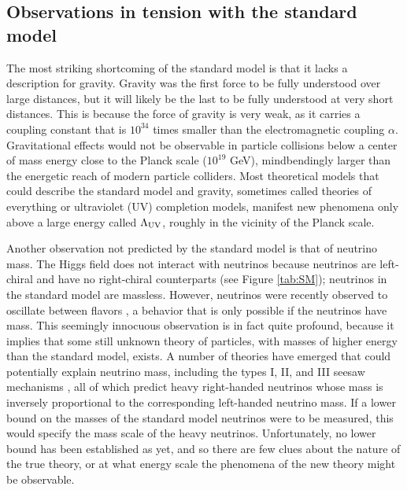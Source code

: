 \subsection{Observations in tension with the standard model}
The most striking shortcoming of the standard model is that it lacks a description for gravity.  Gravity was the first force to be fully understood over large distances, but it will likely be the last to be fully understood at very short distances. This is because the force of gravity is very weak, as it carries a coupling constant that is $10^{34}$ times smaller than the electromagnetic coupling $\alpha$. Gravitational effects would not be observable in particle collisions below a center of mass energy close to the Planck scale ($10^{19}$ GeV), mindbendingly larger than the energetic reach of modern particle colliders. Most theoretical models that could describe the standard model and gravity, sometimes called theories of everything or ultraviolet (UV) completion models, manifest new phenomena only above a large energy called $\Lambda_{\rm UV}$, roughly in the vicinity of the Planck scale. 

Another observation not predicted by the standard model is that of neutrino mass.  The Higgs field does not interact with neutrinos because neutrinos are left-chiral and have no right-chiral counterparts (see Figure \ref{tab:SM}); neutrinos in the standard model are massless. However, neutrinos were recently observed to oscillate between flavors \cite{Fukuda:1998mi}, a behavior that is only possible if the neutrinos have mass. This seemingly innocuous observation is in fact quite profound, because it implies that some still unknown theory of particles, with masses of higher energy than the standard model, exists. A number of theories have emerged that could potentially explain neutrino mass, including the types I, II, and III seesaw mechanisms \cite{Yanagida:1980xy}, all of which predict heavy right-handed neutrinos whose mass is inversely proportional to the corresponding left-handed neutrino mass. If a lower bound on the masses of the standard model neutrinos were to be measured, this would specify the mass scale of the heavy neutrinos. Unfortunately, no lower bound has been established as yet, and so there are few clues about the nature of the true theory, or at what energy scale the phenomena of the new theory might be observable.


